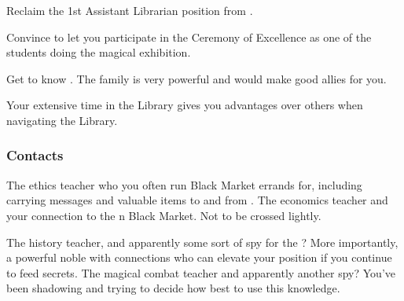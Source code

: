 \documentclass[char]{GL2020}
\begin{document}
\begin{itemz}
     \item Reclaim the 1st Assistant Librarian position from \cAmbition{}.
     \item Convince \cMusic{} to let you participate in the Ceremony of Excellence as one of the students doing the magical exhibition.
     \item Get to know \cChupStudent{}. The \cChupSecond{\formal} family is very powerful and would make good allies for you.
\end{itemz}

\begin{itemz}[Notes]
    \item Your extensive time in the Library gives you advantages over others when navigating the Library.
\end{itemz}

\subsubsection*{Contacts}
\begin{contacts}
    \contact{\cEthics{}} The ethics teacher who you often run Black Market errands for, including carrying messages and valuable items to and from \cChupSecond{}.
    \contact{\cChupSecond{}} The economics teacher and your connection to the \pEarth{}n Black Market. Not to be crossed lightly. 
\end{contacts}

\begin{contacts}
    \contact{\cHistory{}} The history teacher, and apparently some sort of spy for the \pFarm{}? More importantly, a powerful noble with connections who can elevate your position if you continue to feed \cHistory{\them} secrets.
    \contact{\cInterpol{}} The magical combat teacher and apparently another spy? You've been shadowing \cInterpol{} and trying to decide how best to use this knowledge. 
\end{contacts}
\end{document}
